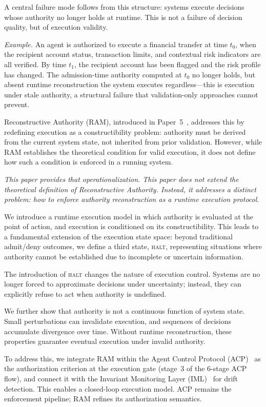 \documentclass[11pt]{article}
\begin{document}
A central failure mode follows from this structure: systems execute decisions whose
authority no longer holds at runtime. This is not a failure of decision quality, but of
execution validity.

\textit{Example.} An agent is authorized to execute a financial transfer at time $t_0$,
when the recipient account status, transaction limits, and contextual risk indicators are
all verified. By time $t_1$, the recipient account has been flagged and the risk profile
has changed. The admission-time authority computed at $t_0$ no longer holds, but absent
runtime reconstruction the system executes regardless---this is execution under stale
authority, a structural failure that validation-only approaches cannot prevent.

Reconstructive Authority (RAM), introduced in Paper~5~\cite{fernandez2026ram}, addresses
this by redefining execution as a constructibility problem: authority must be derived from
the current system state, not inherited from prior validation. However, while RAM
establishes the theoretical condition for valid execution, it does not define how such a
condition is enforced in a running system.

\textit{This paper provides that operationalization. This paper does not extend the theoretical definition of Reconstructive Authority. Instead, it addresses a distinct problem: how to enforce authority reconstruction as a runtime execution protocol.}

We introduce a runtime execution model in which authority is evaluated at the point of
action, and execution is conditioned on its constructibility. This leads to a fundamental
extension of the execution state space: beyond traditional admit/deny outcomes, we define
a third state, \textsc{halt}, representing situations where authority cannot be established
due to incomplete or uncertain information.

The introduction of \textsc{halt} changes the nature of execution control. Systems are no
longer forced to approximate decisions under uncertainty; instead, they can explicitly
refuse to act when authority is undefined.

We further show that authority is not a continuous function of system state. Small
perturbations can invalidate execution, and sequences of decisions accumulate divergence
over time. Without runtime reconstruction, these properties guarantee eventual execution
under invalid authority.

To address this, we integrate RAM within the Agent Control Protocol
(ACP)~\cite{fernandez2026b} as the authorization criterion at the execution gate (stage~3
of the 6-stage ACP flow), and connect it with the Invariant Monitoring Layer
(IML)~\cite{fernandez2026c} for drift detection. This enables a closed-loop execution
model. ACP remains the enforcement pipeline; RAM refines its authorization semantics.
\end{document}
